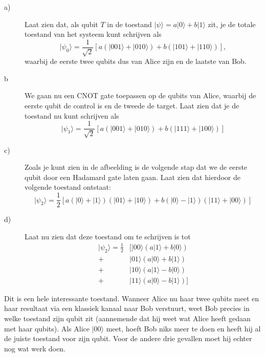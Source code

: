 \documentclass[10pt, a4paper]{article}
\begin{document}
\begin{description}
\item[a)] Laat zien dat, als qubit $T$ in de toestand $|\psi\rangle = a |0\rangle + b|1\rangle$ zit, je de totale toestand van het systeem kunt schrijven als
\begin{equation}
|\psi_0\rangle=\frac{1}{\sqrt{2}}\left[a (|001\rangle + |010\rangle) + b (|101\rangle +|110\rangle)\right],
\end{equation}
waarbij de eerste twee qubits dus van Alice zijn en de laatste van Bob.

\item[b] We gaan nu een CNOT gate toepassen op de qubits van Alice, waarbij de eerste qubit de control is en de tweede de target. Laat zien dat je de toestand nu kunt schrijven als
\begin{equation}
|\psi_1\rangle=\frac{1}{\sqrt{2}}\left[a (|001\rangle + |010\rangle) + b (|111\rangle +|100\rangle)\right]
\end{equation}

\item[c)] Zoals je kunt zien in de afbeelding is de volgende stap dat we de eerste qubit door een Hadamard gate laten gaan. Laat zien dat hierdoor de volgende toestand ontstaat:
\begin{equation}
|\psi_2\rangle=\frac{1}{2}\left[a (|0\rangle +|1\rangle)(|01\rangle + |10\rangle) + b (|0\rangle - |1\rangle)(|11\rangle +|00\rangle)\right]
\end{equation}

\item[d)] Laat nu zien dat deze toestand om te schrijven is tot
\begin{align*}
|\psi_2\rangle=\frac{1}{2}&\big[ |00\rangle(a|1\rangle + b |0\rangle) \\
+& |01\rangle (a|0\rangle + b|1\rangle) \\
+&|10\rangle(a|1\rangle - b|0\rangle) \\
+ &|11\rangle (a|0\rangle - b|1\rangle) \big]
\end{align*}
\end{description}
Dit is een hele interessante toestand. Wanneer Alice nu haar twee qubits meet en haar resultaat via een klassiek kanaal naar Bob verstuurt, weet Bob precies in welke toestand zijn qubit zit (aannemende dat hij weet wat Alice heeft gedaan met haar qubits). Als Alice $|00\rangle$ meet, hoeft Bob niks meer te doen en heeft hij al de juiste toestand voor zijn qubit. Voor de andere drie gevallen moet hij echter nog wat werk doen.
\end{document}
